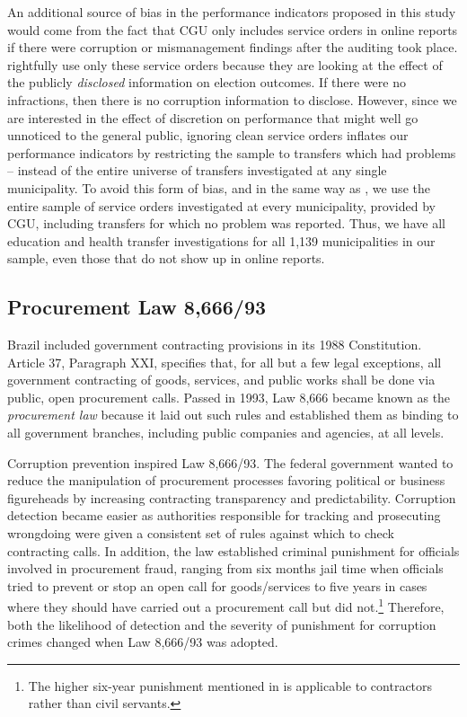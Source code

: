 \documentclass[11pt]{article}
\begin{document}


An additional source of bias in the performance indicators proposed in this study would come from the fact that CGU only includes service orders in online reports if there were corruption or mismanagement findings after the auditing took place. \citet{FerrazExposingCorruptPoliticians2008b} rightfully use only these service orders because they are looking at the effect of the publicly \emph{disclosed} information on election outcomes. If there were no infractions, then there is no corruption information to disclose. However, since we are interested in the effect of discretion on performance that might well go unnoticed to the general public, ignoring clean service orders inflates our performance indicators by restricting the sample to transfers which had problems -- instead of the entire universe of transfers investigated at any single municipality. To avoid this form of bias, and in the same way as \citet{FerrazElectoralAccountabilityCorruption2011a}, we use the entire sample of service orders investigated at every municipality, provided by CGU, including transfers for which no problem was reported. Thus, we have all education and health transfer investigations for all 1,139 municipalities in our sample, even those that do not show up in online reports.


\subsection{Procurement Law 8,666/93} \label{subsec:law866693}

Brazil included government contracting provisions in its 1988 Constitution. Article 37, Paragraph XXI, specifies that, for all but a few legal exceptions, all government contracting of goods, services, and public works shall be done via public, open procurement calls. Passed in 1993, Law 8,666 became known as the \emph{procurement law} because it laid out such rules and established them as binding to all government branches, including public companies and agencies, at all levels.

Corruption prevention inspired Law 8,666/93. The federal government wanted to reduce the manipulation of procurement processes favoring political or business figureheads by increasing contracting transparency and predictability. Corruption detection became easier as authorities responsible for tracking and prosecuting wrongdoing were given a consistent set of rules against which to check contracting calls. In addition, the law established criminal punishment for officials involved in procurement fraud, ranging from six months jail time when officials tried to prevent or stop an open call for goods/services to five years in cases where they should have carried out a procurement call but did not.\footnote{The higher six-year punishment mentioned in \citet{ZamboniAuditRiskRent2018} is applicable to contractors rather than civil servants.} Therefore, both the likelihood of detection and the severity of punishment for corruption crimes changed when Law 8,666/93 was adopted.
\end{document}
